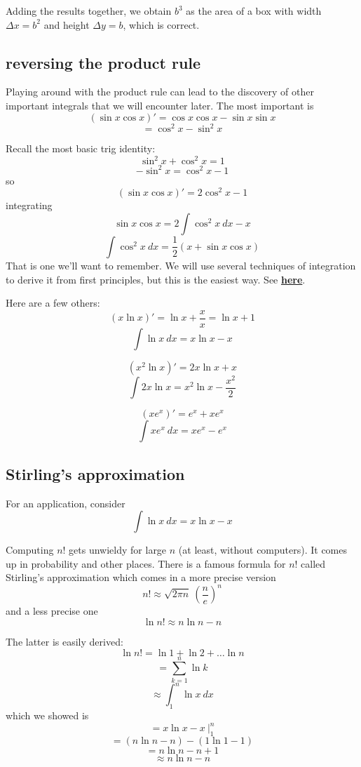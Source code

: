 \documentclass[11pt, oneside]{article}
\begin{document}
Adding the results together, we obtain $b^3$ as the area of a box with width $\Delta x = b^2$ and height $\Delta y = b$, which is correct.

\subsection*{reversing the product rule}

Playing around with the product rule can lead to the discovery of other important integrals that we will encounter later.  The most important is
\[ (\sin x \cos x)' = \cos x \cos x - \sin x \sin x  \]
\[ = \cos^2 x - \sin^2 x \]

Recall the most basic trig identity:
\[ \sin^2 x + \cos^2 x = 1 \]
\[ -\sin^2 x = \cos^2 x - 1 \]
so
\[ (\sin x \cos x)' = 2 \cos^2 x - 1 \]
integrating
\[ \sin x \cos x = 2 \int \cos^2 x \ dx  - x \]
\[ \int \cos^2 x \ dx = \frac{1}{2} (x + \sin x \cos x) \]
That is one we'll want to remember.  We will use several techniques of integration to derive it from first principles, but this is the easiest way.  See \hyperref[sec:Cosine_squared]{\textbf{here}}.

Here are a few others:
\[ (x \ln x)' = \ln x + \frac{x}{x} = \ln x + 1 \]
\[ \int \ln x \ dx = x \ln x - x \]

\[ (x^2 \ln x)' = 2 x \ln x + x \]
\[ \int 2 x \ln x = x^2 \ln x - \frac{x^2}{2} \]

\[ (x e^x)' = e^x + x e^x \]
\[ \int x e^x \ dx = x e^x - e^x \]

\subsection*{Stirling's approximation}
For an application, consider
\[ \int \ln x \ dx = x \ln x - x \]

Computing $n!$ gets unwieldy for large $n$ (at least, without computers).  It comes up in probability and other places.  There is a famous formula for $n!$ called Stirling's approximation which comes in a more precise version
\[ n! \approx \sqrt{2 \pi n} \ (\frac{n}{e})^n \]
and a less precise one
\[ \ln n! \approx n \ln n - n \]

The latter is easily derived:
\[ \ln n! = \ln 1 + \ln 2 + \dots \ln n \]
\[ = \sum_{k=1}^n \ln k \]
\[ \approx \int_1^n \ln x \ dx \]
which we showed is
\[ = x \ln x - x \ \bigg |_1^n \]
\[ = (n \ln n - n) - (1 \ln 1 - 1) \]
\[ = n \ln n - n + 1 \]
\[ \approx n \ln n - n  \]
\end{document}
